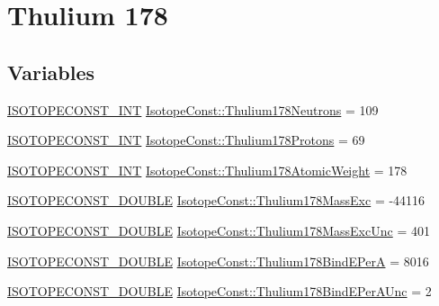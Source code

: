 \hypertarget{group___isotope_const-_thulium-_tm178}{}\section{Thulium 178}
\label{group___isotope_const-_thulium-_tm178}
\subsection*{Variables}
\begin{DoxyCompactItemize}
\item 
\mbox{\hyperlink{group___isotope_const-_macros_ga5f18360b3e99483a35c32d789e62621c}{I\+S\+O\+T\+O\+P\+E\+C\+O\+N\+S\+T\+\_\+\+I\+NT}} \mbox{\hyperlink{group___isotope_const-_thulium-_tm178_ga1d3287753b7d254131f3f01d28e648f8}{Isotope\+Const\+::\+Thulium178\+Neutrons}} = 109
\item 
\mbox{\hyperlink{group___isotope_const-_macros_ga5f18360b3e99483a35c32d789e62621c}{I\+S\+O\+T\+O\+P\+E\+C\+O\+N\+S\+T\+\_\+\+I\+NT}} \mbox{\hyperlink{group___isotope_const-_thulium-_tm178_gad979fca0163bc8960ac981cb015235a8}{Isotope\+Const\+::\+Thulium178\+Protons}} = 69
\item 
\mbox{\hyperlink{group___isotope_const-_macros_ga5f18360b3e99483a35c32d789e62621c}{I\+S\+O\+T\+O\+P\+E\+C\+O\+N\+S\+T\+\_\+\+I\+NT}} \mbox{\hyperlink{group___isotope_const-_thulium-_tm178_ga1dc9c66d4b183a38189ef10353582d83}{Isotope\+Const\+::\+Thulium178\+Atomic\+Weight}} = 178
\item 
\mbox{\hyperlink{group___isotope_const-_macros_ga8f45a7272ce02c0b4c65c44636ed719a}{I\+S\+O\+T\+O\+P\+E\+C\+O\+N\+S\+T\+\_\+\+D\+O\+U\+B\+LE}} \mbox{\hyperlink{group___isotope_const-_thulium-_tm178_gab4b7542e3a0ae2d77e2cf0653442f3c9}{Isotope\+Const\+::\+Thulium178\+Mass\+Exc}} = -\/44116
\item 
\mbox{\hyperlink{group___isotope_const-_macros_ga8f45a7272ce02c0b4c65c44636ed719a}{I\+S\+O\+T\+O\+P\+E\+C\+O\+N\+S\+T\+\_\+\+D\+O\+U\+B\+LE}} \mbox{\hyperlink{group___isotope_const-_thulium-_tm178_gaa746a08041ee6ae7b8c398a7705f66d7}{Isotope\+Const\+::\+Thulium178\+Mass\+Exc\+Unc}} = 401
\item 
\mbox{\hyperlink{group___isotope_const-_macros_ga8f45a7272ce02c0b4c65c44636ed719a}{I\+S\+O\+T\+O\+P\+E\+C\+O\+N\+S\+T\+\_\+\+D\+O\+U\+B\+LE}} \mbox{\hyperlink{group___isotope_const-_thulium-_tm178_ga19d686494207662ffb240f0c18379b77}{Isotope\+Const\+::\+Thulium178\+Bind\+E\+PerA}} = 8016
\item 
\mbox{\hyperlink{group___isotope_const-_macros_ga8f45a7272ce02c0b4c65c44636ed719a}{I\+S\+O\+T\+O\+P\+E\+C\+O\+N\+S\+T\+\_\+\+D\+O\+U\+B\+LE}} \mbox{\hyperlink{group___isotope_const-_thulium-_tm178_gaf4643dbd67f39444da72541f9d091e7c}{Isotope\+Const\+::\+Thulium178\+Bind\+E\+Per\+A\+Unc}} = 2

\end{DoxyCompactItemize}
